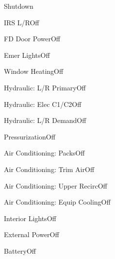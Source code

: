 \documentclass[sim-use]{checklist}
\begin{document}
\begin{checklist}{Shutdown}
  \item{IRS L/R}{Off}
  \item{FD Door Power}{Off}
  \item{Emer Lights}{Off}
  \item{Window Heating}{Off}
  \item{Hydraulic: L/R Primary}{Off}
  \item{Hydraulic: Elec C1/C2}{Off}
  \item{Hydraulic: L/R Demand}{Off}
  \item{Pressurization}{Off}
  \item{Air Conditioning: Packs}{Off}
  \item{Air Conditioning: Trim Air}{Off}
  \item{Air Conditioning: Upper Recirc}{Off}
  \item{Air Conditioning: Equip Cooling}{Off}
  \item{Interior Lights}{Off}
  \item{External Power}{Off}
  \item{Battery}{Off}
\end{checklist}
\end{document}
